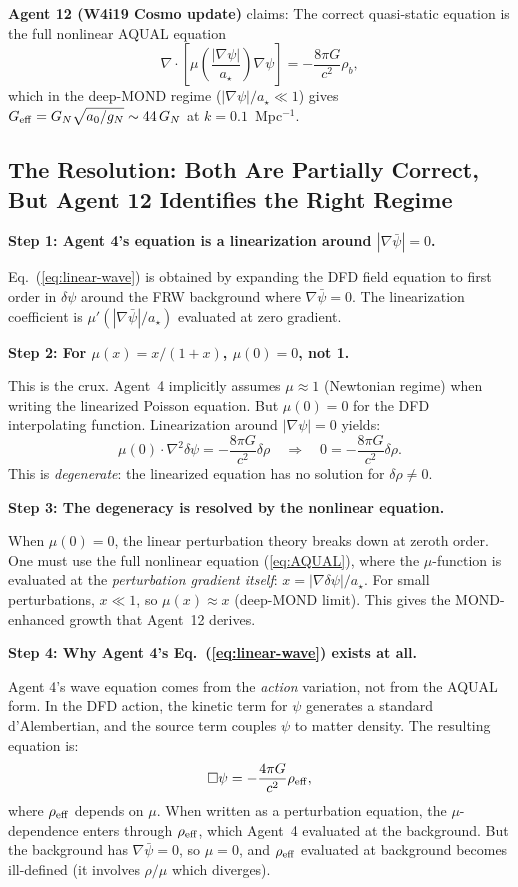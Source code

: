\documentclass[11pt]{article}
\newcommand{\Geff}{G_{\rm eff}}
\newcommand{\GN}{G_N}
\newcommand{\astar}{a_\star}
\newcommand{\dpsi}{\delta\psi}
\begin{document}
\textbf{Agent 12 (W4i19 Cosmo update)} claims: The correct quasi-static
equation is the full nonlinear AQUAL equation
\begin{equation}
\nabla \cdot \left[\mu\!\left(\frac{|\nabla\psi|}{\astar}\right)\nabla\psi
\right] = -\frac{8\pi G}{c^2}\rho_b,
\label{eq:AQUAL}
\end{equation}
which in the deep-MOND regime ($|\nabla\psi|/\astar \ll 1$) gives
$\Geff = \GN\sqrt{a_0/g_N} \sim 44\,\GN$ at $k = 0.1$~Mpc$^{-1}$.

\subsection{The Resolution: Both Are Partially Correct, But Agent 12 Identifies
the Right Regime}

\textbf{Step 1: Agent 4's equation is a linearization around $|\nabla\bar\psi|
= 0$.}

Eq.~(\ref{eq:linear-wave}) is obtained by expanding the DFD field equation
to first order in $\dpsi$ around the FRW background where
$\nabla\bar\psi = 0$. The linearization coefficient is
$\mu'(|\nabla\bar\psi|/\astar)$ evaluated at zero gradient.

\textbf{Step 2: For $\mu(x) = x/(1+x)$, $\mu(0) = 0$, not 1.}

This is the crux. Agent~4 implicitly assumes $\mu \approx 1$ (Newtonian regime)
when writing the linearized Poisson equation. But $\mu(0) = 0$ for the
DFD interpolating function. Linearization around $|\nabla\psi| = 0$ yields:
\begin{equation}
\mu(0) \cdot \nabla^2\dpsi = -\frac{8\pi G}{c^2}\delta\rho
\quad \Longrightarrow \quad 0 = -\frac{8\pi G}{c^2}\delta\rho.
\end{equation}
This is \emph{degenerate}: the linearized equation has no solution for
$\delta\rho \neq 0$.

\textbf{Step 3: The degeneracy is resolved by the nonlinear equation.}

When $\mu(0) = 0$, the linear perturbation theory breaks down at zeroth order.
One must use the full nonlinear equation (\ref{eq:AQUAL}), where the
$\mu$-function is evaluated at the \emph{perturbation gradient itself}:
$x = |\nabla\dpsi|/\astar$. For small perturbations, $x \ll 1$,
so $\mu(x) \approx x$ (deep-MOND limit). This gives the MOND-enhanced
growth that Agent~12 derives.

\textbf{Step 4: Why Agent 4's Eq.~(\ref{eq:linear-wave}) exists at all.}

Agent 4's wave equation comes from the \emph{action} variation, not from
the AQUAL form. In the DFD action, the kinetic term for $\psi$ generates
a standard d'Alembertian, and the source term couples $\psi$ to matter
density. The resulting equation is:
\begin{equation}
\Box\psi = -\frac{4\pi G}{c^2}\rho_{\rm eff},
\end{equation}
where $\rho_{\rm eff}$ depends on $\mu$. When written as a perturbation
equation, the $\mu$-dependence enters through $\rho_{\rm eff}$, which
Agent~4 evaluated at the background. But the background has
$\nabla\bar\psi = 0$, so $\mu = 0$, and $\rho_{\rm eff}$ evaluated at
background becomes ill-defined (it involves $\rho/\mu$ which diverges).
\end{document}

